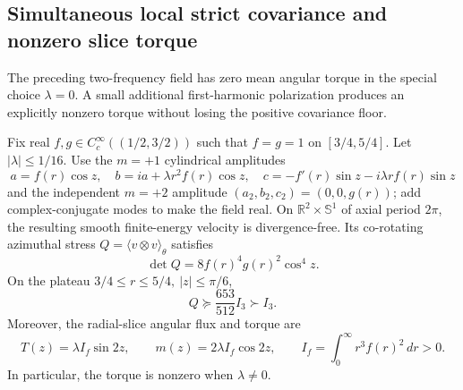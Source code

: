 
\subsection{Simultaneous local strict covariance and nonzero slice torque}
\label{subsec:two-mode-torque-XXIV}
The preceding two-frequency field has zero mean angular torque in
the special choice $\lambda=0$. A small additional first-harmonic
polarization produces an explicitly nonzero torque without losing
the positive covariance floor.

\begin{proposition}
\label{prop:two-mode-torque-XXIV}
Fix real $f,g\in C_c^\infty((1/2,3/2))$ such that
$f=g=1$ on $[3/4,5/4]$. Let $|\lambda|\le1/16$.
Use the $m=+1$ cylindrical amplitudes
\[
a=f(r)\cos z,\quad
b=ia+\lambda r^2f(r)\cos z,\quad
c=-f'(r)\sin z-i\lambda rf(r)\sin z
\]
and the independent $m=+2$ amplitude
$(a_2,b_2,c_2)=(0,0,g(r))$; add complex-conjugate modes
to make the field real. On $\mathbb R^2\times\mathbb S^1$
of axial period $2\pi$, the resulting smooth finite-energy
velocity is divergence-free. Its co-rotating azimuthal stress
$Q=\langle v\otimes v\rangle_\theta$ satisfies
\[
\boxed{\det Q=8 f(r)^4g(r)^2\cos^4z.}
\]
On the plateau
$3/4\le r\le5/4,\ |z|\le\pi/6$,
\begin{equation}\label{eq:strict-positive-torque-XXIV}
\boxed{\quad Q\succeq\frac{653}{512}I_3
             \succ I_3.\quad}
\end{equation}
Moreover, the radial-slice angular flux and torque are
\[
\boxed{
T(z)=\lambda I_f\sin 2z,\qquad
m(z)=2\lambda I_f\cos2z,\qquad
I_f=\int_0^\infty r^3 f(r)^2\,dr>0.
}
\]
In particular, the torque is nonzero when $\lambda\ne0$.
\end{proposition}
